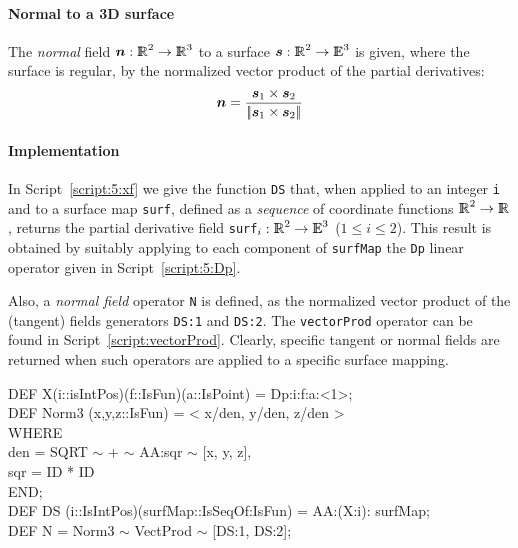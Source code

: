 \documentclass{31x47jw}
\begin{document}
\paragraph{Normal to a 3D surface}

The \emph{normal} field ${\mbox{\boldmath $n$}}: \mathbb{I\!\!R}^{2}\rightarrow\mathbb{I\!\!R}^{3}$ to a surface
${\mbox{\boldmath $s$}}: \mathbb{I\!\!R}^{2}\rightarrow\mathbb{I\!\!E}^{3}$ is given, where the surface is
regular, by the normalized vector product of the partial derivatives:
\[
{\mbox{\boldmath $n$}} = {{\mbox{\boldmath $s$}}_{1} \times {\mbox{\boldmath $s$}}_{2}
\over {\left|\!\left|{\mbox{\boldmath $s$}}_{1} \times {\mbox{\boldmath $s$}}_{2}\right|\!\right|}}
\]

\paragraph{Implementation}

In Script~\ref{script:5:xf} we give the function \texttt{DS} that,
when applied to an integer \texttt{i} and to a surface map
\texttt{surf}, defined as a \emph{sequence} of coordinate functions
$\mathbb{I\!\!R}^{2}\rightarrow \mathbb{I\!\!R}$, returns the partial derivative field
\texttt{surf}$_{i} : \mathbb{I\!\!R}^{2}\rightarrow \mathbb{I\!\!E}^{3}$ ($1\leq i\leq 2$). 
This result is obtained by suitably applying to each component of
\texttt{surfMap} the \texttt{Dp} linear operator given in
Script~\ref{script:5:Dp}.

Also, a \emph{normal field} operator \texttt{N} is defined, as the
normalized vector product of the (tangent) fields generators
\texttt{DS:1} and \texttt{DS:2}.  The \texttt{vectorProd} operator can
be found in Script~\ref{script:vectorProd}.  Clearly, specific tangent
or normal fields are returned when such operators are applied to a
specific surface mapping.

\begin{script}
\begin{smallplasm}
DEF X(i::isIntPos)(f::IsFun)(a::IsPoint) = Dp:i:f:a:<1>;\\
DEF Norm3 (x,y,z::IsFun) = < x/den, y/den, z/den >\\
WHERE\+\\
  den = SQRT  $\sim$  +  $\sim$  AA:sqr  $\sim$  [x, y, z],\\
  sqr = ID * ID\-\\
END;\\[0.3cm]

DEF DS  (i::IsIntPos)(surfMap::IsSeqOf:IsFun) = AA:(X:i): surfMap;\\
DEF N  = Norm3  $\sim$  VectProd  $\sim$  [DS:1, DS:2];
\end{smallplasm}
\label{script:5:xf}
\end{script}
\end{document}
